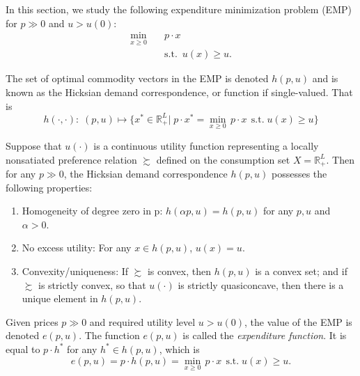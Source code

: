 \documentclass[12pt,fleqn]{book} %
\begin{document}
In this section, we study the following expenditure minimization problem (EMP) for
$p\gg 0$ and $u > u(0)$:
\begin{align*}
\min_{x\ge 0} \quad &  p\cdot x\\
& \mathrm{s.t.}\ \; u(x)\ge u.
\end{align*}





\begin{definition}
The set of optimal commodity vectors in the EMP is denoted $h(p, u)$ and is known as the Hicksian demand correspondence, or function if single-valued. That is
\[
h(\cdot,\cdot):\;(p,u)\mapsto \{x^*\in\mathbb{R}_+^L|\;p\cdot x^*=\min_{x\ge 0}\, p\cdot x\ \ \mathrm{s.t.}\; u(x)\ge u\}
\]	
\end{definition}

\begin{proposition}
	 Suppose that $u(\cdot)$ is a continuous utility function representing a
	locally nonsatiated preference relation $\succsim$ defined on the consumption set $X=\mathbb{R}_+^L$.
	Then for any $p \gg 0$, the Hicksian demand correspondence $h(p, u)$ possesses the
	following properties:
	\begin{enumerate}
		\item Homogeneity of degree zero in p: $h(\alpha p, u) = h(p, u)$ for any $p, u$ and $\alpha > 0$.
		\item No excess utility: For any $x \in h(p, u)$, $u(x) = u$.
		\item Convexity/uniqueness: If $\succsim$ is convex, then $h(p, u)$ is a convex set; and if $\succsim$ is strictly convex, so that $u(\cdot)$ is strictly quasiconcave, then there is
		a unique element in $h(p, u)$.
	\end{enumerate}
\end{proposition}

\begin{definition}
	Given prices $p \gg 0$ and required utility level $u > u(0)$, the value of the EMP is denoted
	$e(p, u)$. The function $e(p, u)$ is called the \emph{expenditure function}. It is equal to $p\cdot h^*$ for any $h^*\in h(p, u)$, which is
	\[
	e(p, u)=p\cdot h(p, u)=\min_{x\ge 0}\, p\cdot x\ \ \mathrm{s.t.}\; u(x)\ge u.
	\]
	
\end{definition}
\end{document}
